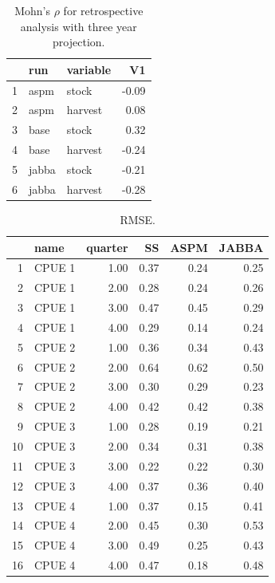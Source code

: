 \documentclass[a4paper]{article}
\begin{document}
\begin{table}[ht]
\caption{Mohn's $\rho$ for retrospective analysis with three year projection.}  
\label{tab:proj}
\centering
\begin{tabular}{rllr}
  \hline
 & run & variable & V1 \\ 
  \hline
  1 & aspm & stock & -0.09 \\ 
  2 & aspm & harvest & 0.08 \\ 
  3 & base & stock & 0.32 \\ 
  4 & base & harvest & -0.24 \\ 
  5 & jabba & stock & -0.21 \\ 
  6 & jabba & harvest & -0.28 \\
   \hline
\end{tabular}
\end{table}



\begin{table}[ht]
\caption{RMSE.}  
\label{tab:rmse}
\centering
\begin{tabular}{rlrrrr}
  \hline
 & name & quarter & SS & ASPM & JABBA \\ 
  \hline
  1 & CPUE 1 & 1.00 & 0.37 & 0.24 & 0.25 \\ 
  2 & CPUE 1 & 2.00 & 0.28 & 0.24 & 0.26 \\ 
  3 & CPUE 1 & 3.00 & 0.47 & 0.45 & 0.29 \\ 
  4 & CPUE 1 & 4.00 & 0.29 & 0.14 & 0.24 \\ 
  5 & CPUE 2 & 1.00 & 0.36 & 0.34 & 0.43 \\ 
  6 & CPUE 2 & 2.00 & 0.64 & 0.62 & 0.50 \\ 
  7 & CPUE 2 & 3.00 & 0.30 & 0.29 & 0.23 \\ 
  8 & CPUE 2 & 4.00 & 0.42 & 0.42 & 0.38 \\ 
  9 & CPUE 3 & 1.00 & 0.28 & 0.19 & 0.21 \\ 
  10 & CPUE 3 & 2.00 & 0.34 & 0.31 & 0.38 \\ 
  11 & CPUE 3 & 3.00 & 0.22 & 0.22 & 0.30 \\ 
  12 & CPUE 3 & 4.00 & 0.37 & 0.36 & 0.40 \\ 
  13 & CPUE 4 & 1.00 & 0.37 & 0.15 & 0.41 \\ 
  14 & CPUE 4 & 2.00 & 0.45 & 0.30 & 0.53 \\ 
  15 & CPUE 4 & 3.00 & 0.49 & 0.25 & 0.43 \\ 
  16 & CPUE 4 & 4.00 & 0.47 & 0.18 & 0.48 \\ 
   \hline
\end{tabular}
\end{table}
\end{document}
